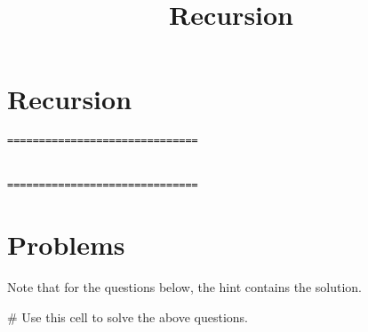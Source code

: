 \documentclass{ximera}
\title{Recursion}
\begin{document}
  
\begin{abstract}  

\end{abstract}  
\maketitle

\section{Recursion}






\begin{verbatim}
==============================


==============================
\end{verbatim}


\begin{sageCell}
\end{sageCell}

\section{Problems}

Note that for the questions below, the hint contains the solution.

\begin{question}
\end{question}

\begin{sageCell}
# Use this cell to solve the above questions.
\end{sageCell}
\end{document}
